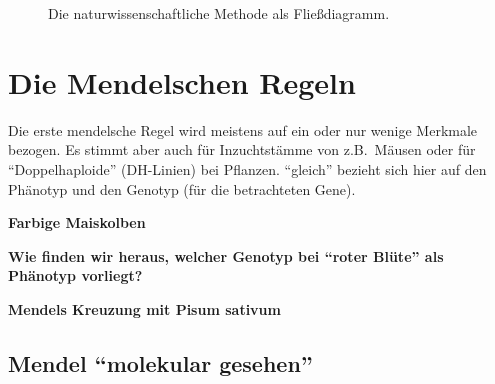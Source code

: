 


\begin{figure}[H]
    \caption{Die naturwissenschaftliche Methode als Fließdiagramm.}\label{fig:figure7}
\end{figure}


\section{Die Mendelschen Regeln}\label{sec:die-mendelschen-regeln}


Die erste mendelsche Regel wird meistens auf ein oder nur wenige Merkmale bezogen.
Es stimmt aber auch für Inzuchtstämme von z.B.\ Mäusen oder für ``Doppelhaploide'' (DH-Linien) bei Pflanzen.
``gleich'' bezieht sich hier auf den Phänotyp und den Genotyp (für die betrachteten Gene).

\begin{bsp}
    \textbf{Farbige Maiskolben} \\
\end{bsp}





\begin{bsp}
    \textbf{Wie finden wir heraus, welcher Genotyp bei ``roter Blüte'' als Phänotyp vorliegt?}
\end{bsp}




\begin{bsp}
    \textbf{Mendels Kreuzung mit Pisum sativum}
\end{bsp}



\subsection{Mendel ``molekular gesehen''}\label{subsec:mendel-``molekular-gesehen''}

